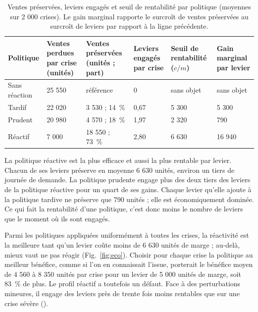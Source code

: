 \begin{table}[htbp]
\caption{Ventes préservées, leviers engagés et seuil de rentabilité par politique (moyennes sur 2 000 crises). Le gain marginal rapporte le surcroît de ventes préservées au surcroît de leviers par rapport à la ligne précédente.}
\label{tab:eco}
\footnotesize
\begin{tabularx}{\textwidth}{@{}LLLLLL@{}}
\toprule
\textbf{Politique} & \textbf{Ventes perdues par crise (unités)} & \textbf{Ventes préservées (unités ; part)} & \textbf{Leviers engagés par crise} & \textbf{Seuil de rentabilité ($c/m$)} & \textbf{Gain marginal par levier} \\
\midrule
Sans réaction & 25 550 & référence & 0 & sans objet & sans objet \\
Tardif & 22 020 & 3 530 ; 14~\% & 0,67 & 5 300 & 5 300 \\
Prudent & 20 980 & 4 570 ; 18~\% & 1,97 & 2 320 & 790 \\
Réactif & 7 000 & 18 550 ; 73~\% & 2,80 & 6 630 & 16 940 \\
\bottomrule
\end{tabularx}
\end{table}

La politique réactive est la plus efficace et aussi la plus rentable par levier. Chacun de ses leviers préserve en moyenne 6 630 unités, environ un tiers de journée de demande. La politique prudente engage plus des deux tiers des leviers de la politique réactive pour un quart de ses gains. Chaque levier qu'elle ajoute à la politique tardive ne préserve que 790 unités ; elle est économiquement dominée. Ce qui fait la rentabilité d'une politique, c'est donc moins le nombre de leviers que le moment où ils sont engagés.

\begin{center}

\label{fig:eco}
\end{center}

Parmi les politiques appliquées uniformément à toutes les crises, la réactivité est la meilleure tant qu'un levier coûte moins de 6 630 unités de marge ; au-delà, mieux vaut ne pas réagir (Fig.~\ref{fig:eco}). Choisir pour chaque crise la politique au meilleur bénéfice, comme si l'on en connaissait l'issue, porterait le bénéfice moyen de 4 560 à 8 350 unités par crise pour un levier de 5 000 unités de marge, soit 83~\% de plus. Le profil réactif a toutefois un défaut. Face à des perturbations mineures, il engage des leviers près de trente fois moins rentables que sur une crise sévère ().
